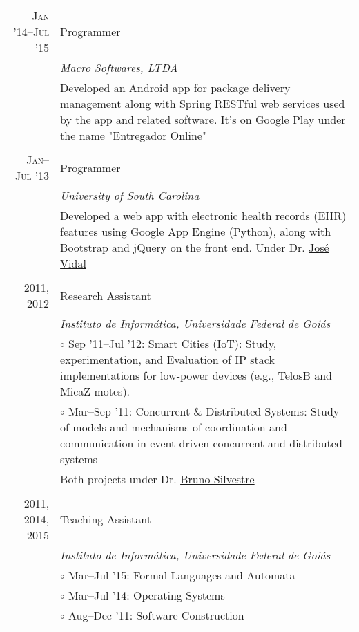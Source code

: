 \documentclass[a4paper,10pt]{article}
\begin{document}
\begin{longtable}{r|p{11cm}}
  \textsc{Jan '14--Jul '15} & Programmer \\ &\emph{Macro Softwares,
  LTDA}\\ &\footnotesize{Developed an Android app for package delivery
  management along with Spring RESTful web services used by the app
  and related software. It's on Google Play under the name "Entregador
  Online"}\\ \multicolumn{2}{c}{} \\

  \textsc{Jan--Jul '13} & Programmer \\ &\emph{University of South Carolina}\\
  &\footnotesize{Developed a web app with electronic health
  records (EHR) features using Google App Engine
  (Python), along with Bootstrap and jQuery on the front end.
  Under Dr. \href{http://jmvidal.cse.sc.edu}{José Vidal}}\\
  \multicolumn{2}{c}{} \\

  \textsc{2011, 2012} & Research Assistant \\ &\emph{Instituto
  de Informática, Universidade Federal de Goiás}\\
  &\footnotesize{$\circ$ Sep '11--Jul '12: Smart Cities (IoT): Study, experimentation,
  and Evaluation of IP stack implementations for low-power devices
  (e.g., TelosB and MicaZ motes).}\\  &\footnotesize{$\circ$ Mar--Sep '11: Concurrent \& Distributed Systems: Study of
  models and mechanisms of coordination and communication in
  event-driven concurrent and distributed systems}\\
 &\footnotesize{Both projects
  under Dr. \href{http://inf.ufg.br/~brunoos/}{Bruno Silvestre}}\\

  \multicolumn{2}{c}{} \\

  \textsc{2011, 2014, 2015} & Teaching Assistant \\ &\emph{Instituto
  de Informática, Universidade Federal de Goiás} \\
  &\footnotesize{$\circ$ Mar--Jul '15: Formal Languages and Automata} \\
  &\footnotesize{$\circ$ Mar--Jul '14: Operating Systems} \\
  &\footnotesize{$\circ$ Aug--Dec '11: Software Construction}\\

\end{longtable}
\end{document}
